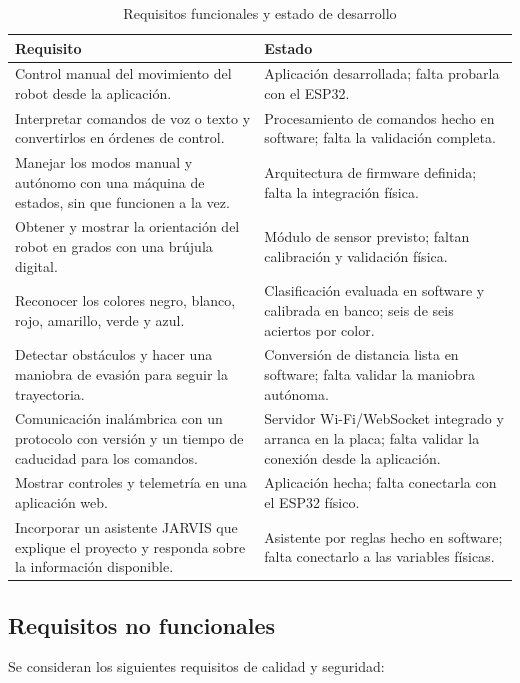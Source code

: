 \documentclass[journal]{IEEEtran}
\begin{document}
\begin{table}[t]
\centering
\caption{Requisitos funcionales y estado de desarrollo}
\label{tab:requisitos}
\scriptsize
\begin{tabular}{p{} p{}}
\toprule
\textbf{Requisito} & \textbf{Estado} \\
\midrule
Control manual del movimiento del robot desde la aplicación. & Aplicación desarrollada; falta probarla con el ESP32. \\
Interpretar comandos de voz o texto y convertirlos en órdenes de control. & Procesamiento de comandos hecho en software; falta la validación completa. \\
Manejar los modos manual y autónomo con una máquina de estados, sin que funcionen a la vez. & Arquitectura de firmware definida; falta la integración física. \\
Obtener y mostrar la orientación del robot en grados con una brújula digital. & Módulo de sensor previsto; faltan calibración y validación física. \\
Reconocer los colores negro, blanco, rojo, amarillo, verde y azul. & Clasificación evaluada en software y calibrada en banco; seis de seis aciertos por color. \\
Detectar obstáculos y hacer una maniobra de evasión para seguir la trayectoria. & Conversión de distancia lista en software; falta validar la maniobra autónoma. \\
Comunicación inalámbrica con un protocolo con versión y un tiempo de caducidad para los comandos. & Servidor Wi-Fi/WebSocket integrado y arranca en la placa; falta validar la conexión desde la aplicación. \\
Mostrar controles y telemetría en una aplicación web. & Aplicación hecha; falta conectarla con el ESP32 físico. \\
Incorporar un asistente JARVIS que explique el proyecto y responda sobre la información disponible. & Asistente por reglas hecho en software; falta conectarlo a las variables físicas. \\
\bottomrule
\end{tabular}
\end{table}

\subsection{Requisitos no funcionales}

Se consideran los siguientes requisitos de calidad y seguridad:
\end{document}
